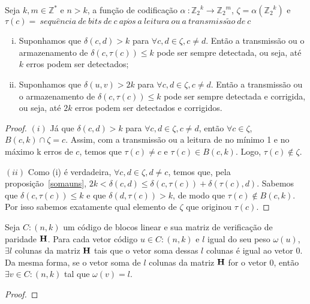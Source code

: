 \begin{theorem}
Seja $k, m \in {\mathbb{Z}}^*$ e $n > k$, a função de codificação $\alpha\ : {\mathbb{Z}_2}^k \rightarrow {\mathbb{Z}_2}^m$, $\zeta=\alpha({\mathbb{Z}_2}^k)$ e $\tau(c)=\ sequ\hat{e}ncia\ de\ bits\ de\ c\ ap\acute{o}s\ a\ leitura\ ou\ a\ transmiss\tilde{a}o\ de\ c$
  \begin{enumerate}[(i)]
     \item Suponhamos que $\delta(c,d) > k$ para $\forall c, d \in \zeta, c \neq d$. Então a transmissão ou o armazenamento de $\delta(c,\tau(c)) \leq k$ pode ser sempre detectada, ou seja, até $k$ erros podem ser detectados;
     \item Suponhamos que $\delta(u,v) > 2k$ para $\forall c, d \in \zeta, c \neq d$. Então a transmissão ou o armazenamento de $\delta(c,\tau(c)) \leq k$ pode ser sempre detectada e corrigida, ou seja, até $2k$ erros podem ser detectados e corrigidos.
  \end{enumerate}
\end{theorem}

\begin{proof} $(i)$ Já que $\delta(c,d) > k$  para $\forall c, d \in \zeta, c \neq d$, então $\forall c \in \zeta$, $B(c,k) \cap \zeta = {c}$. Assim, com a transmissão ou a leitura de no mínimo 1 e no máximo k erros de $c$, temos que $\tau(c) \neq c$ e $\tau(c) \in B(c,k)$. Logo, $\tau(c) \not\in \zeta$.

$(ii)$ Como (i) é verdadeira, $\forall c, d \in \zeta, d \neq c$, temos que, pela proposição~\ref{somauns}, $2k < \delta(c,d) \leq \delta(c,\tau(c)) + \delta(\tau(c),d)$. Sabemos que $\delta(c,\tau(c)) \leq k$ e que $\delta(d,\tau(c)) > k$, de modo que $\tau(c) \not\in B(c,k)$. Por isso sabemos exatamente qual elemento de $\zeta$ que originou $\tau(c)$.
\end{proof}

\begin{theorem} Seja $C:(n,k)$ um código de blocos linear e sua matriz de verificação de paridade ${\bf H}$. Para cada vetor código $u \in C:(n,k)$ e $l$ igual do seu peso $\omega(u)$, $\exists l$ colunas da matriz ${\bf H}$ tais que o vetor soma dessas $l$ colunas é igual ao vetor $0$. Da mesma forma, se o vetor soma de $l$ colunas da matriz ${\bf H}$ for o vetor $0$, então $\exists v \in C:(n,k)$ tal que $\omega(v)=l$.
\end{theorem}

\begin{proof}
\end{proof}

